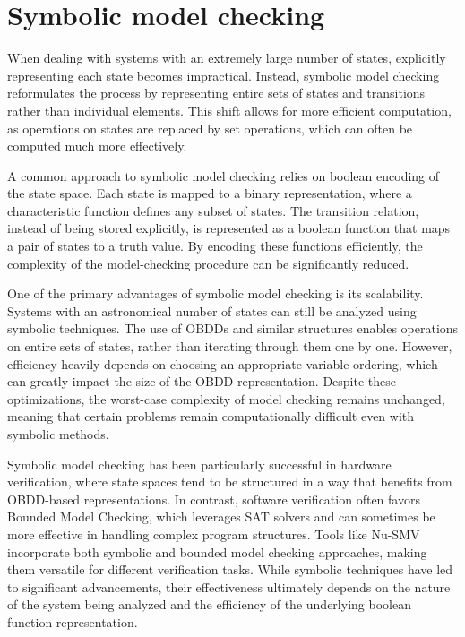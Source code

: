 \section{Symbolic model checking}

When dealing with systems with an extremely large number of states, explicitly representing each state becomes impractical. 
Instead, symbolic model checking reformulates the process by representing entire sets of states and transitions rather than individual elements. 
This shift allows for more efficient computation, as operations on states are replaced by set operations, which can often be computed much more effectively.

A common approach to symbolic model checking relies on boolean encoding of the state space. 
Each state is mapped to a binary representation, where a characteristic function defines any subset of states. 
The transition relation, instead of being stored explicitly, is represented as a boolean function that maps a pair of states to a truth value. 
By encoding these functions efficiently, the complexity of the model-checking procedure can be significantly reduced. 

One of the primary advantages of symbolic model checking is its scalability. 
Systems with an astronomical number of states can still be analyzed using symbolic techniques. 
The use of OBDDs and similar structures enables operations on entire sets of states, rather than iterating through them one by one. 
However, efficiency heavily depends on choosing an appropriate variable ordering, which can greatly impact the size of the OBDD representation. 
Despite these optimizations, the worst-case complexity of model checking remains unchanged, meaning that certain problems remain computationally difficult even with symbolic methods.

Symbolic model checking has been particularly successful in hardware verification, where state spaces tend to be structured in a way that benefits from OBDD-based representations. 
In contrast, software verification often favors Bounded Model Checking, which leverages SAT solvers and can sometimes be more effective in handling complex program structures. 
Tools like Nu-SMV incorporate both symbolic and bounded model checking approaches, making them versatile for different verification tasks. 
While symbolic techniques have led to significant advancements, their effectiveness ultimately depends on the nature of the system being analyzed and the efficiency of the underlying boolean function representation.